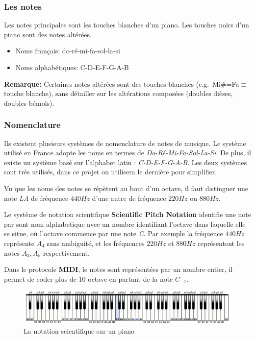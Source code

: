 \documentclass[french,]{article}
\providecommand{\tightlist}{%
  \setlength{\itemsep}{0pt}\setlength{\parskip}{0pt}}
\begin{document}
\hypertarget{les-notes}{%
\subsubsection{Les notes}\label{les-notes}}

Les notes principales sont les touches blanches d'un piano. Les touches
noirs d'un piano sont des notes altérées.

\begin{itemize}
\tightlist
\item
  Noms français: do-ré-mi-fa-sol-la-si
\item
  Noms alphabétiques: C-D-E-F-G-A-B
\end{itemize}

\textbf{Remarque:} Certaines notes altérées sont des touches blanches
(e.g.~Mi\#=Fa\(\equiv\)touche blanche), sans détailler sur les
altérations composées (doubles dièses, doubles bémols).

\hypertarget{nomenclature}{%
\subsubsection{Nomenclature}\label{nomenclature}}

Ils existent plusieurs systèmes de nomenclature de notes de musique. Le
système utilisé en France adopte les noms en termes de
\emph{Do-Ré-Mi-Fa-Sol-La-Si}. De plus, il existe un système basé sur
l'alphabet latin : \emph{C-D-E-F-G-A-B}. Les deux systèmes sont très
utilisés, dans ce projet on utilisera le dernière pour simplifier.

Vu que les noms des notes se répètent au bout d'un octave, il faut
distinguer une note \emph{LA} de fréquence \(440Hz\) d'une autre de
fréquence \(220Hz\) ou \(880Hz\).

Le système de notation scientifique \textbf{Scientific Pitch Notation}
identifie une note par sont nom alphabetique avec un nombre identifiant
l'octave dans laquelle elle se situe, où l'octave commence par une note
\emph{C}. Par exemple la fréquence \(440Hz\) représente \(A_4\) sans
ambiguité, et les fréquences \(220Hz\) et \(880Hz\) représentent les
notes \(A_3, A_5\) respectivement.

Dans le protocole \textbf{MIDI}, le notes sont représentées par un
nombre entier, il permet de coder plus de 10 octave en partant de la
note \(C_{-1}\).

\begin{figure}
\centering
\includegraphics[width=1\textwidth,height=\textheight]{img/piano-keys.png}
\caption{La notation scientifique sur un piano}
\end{figure}
\end{document}
